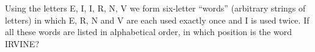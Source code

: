 Using the letters E, I, I, R, N, V we form six-letter ``words'' (arbitrary strings of letters) in which E, R, N and V are each used exactly once and I is used twice. If all these words are listed in alphabetical order, in which position is the word IRVINE?
